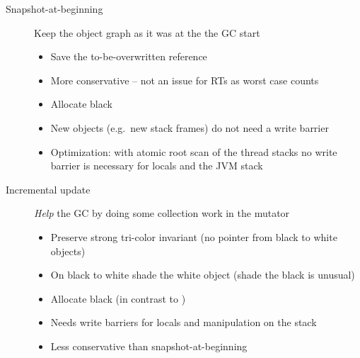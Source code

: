 \begin{description}
    \item[Snapshot-at-beginning] Keep the object graph as it was at
    the the GC start
    \begin{itemize}
        \item Save the to-be-overwritten reference
        \item More conservative -- not an issue for RTs as worst case
        counts
        \item Allocate black
        \item New objects (e.g.\ new stack frames) do not need a
        write barrier
        \item Optimization: with atomic root scan of the thread
        stacks no write barrier is necessary for locals and the JVM
        stack
    \end{itemize}
    \item[Incremental update] \emph{Help} the GC by doing some collection
    work in the mutator
    \begin{itemize}
        \item Preserve strong tri-color invariant (no pointer from
        black to white objects)
        \item On black to white shade the white object (shade the
        black is unusual)
        \item Allocate black (in contrast to \cite{gc:dijkstra78})
        \item Needs write barriers for locals and manipulation on
        the stack
        \item Less conservative than snapshot-at-beginning
    \end{itemize}
\end{description}

